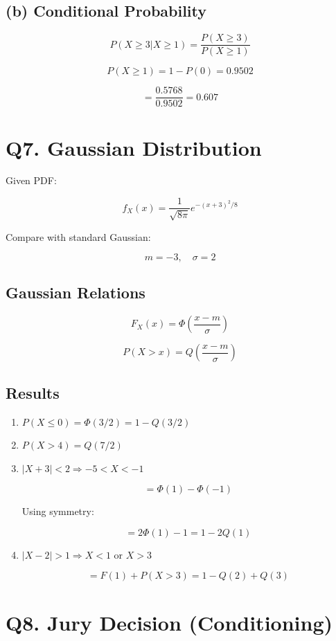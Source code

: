 \documentclass[12pt]{article}
\begin{document}
\subsection*{(b) Conditional Probability}

\[
P(X\ge3|X\ge1)=\frac{P(X\ge3)}{P(X\ge1)}
\]

\[
P(X\ge1)=1-P(0)=0.9502
\]

\[
= \frac{0.5768}{0.9502}=0.607
\]

\section*{Q7. Gaussian Distribution}

Given PDF:

\[
f_X(x)=\frac{1}{\sqrt{8\pi}} e^{-(x+3)^2/8}
\]

Compare with standard Gaussian:

\[
m=-3,\quad \sigma=2
\]

\subsection*{Gaussian Relations}

\[
F_X(x)=\Phi\left(\frac{x-m}{\sigma}\right)
\]

\[
P(X>x)=Q\left(\frac{x-m}{\sigma}\right)
\]

\subsection*{Results}

\begin{enumerate}
    \item $P(X\le0)=\Phi(3/2)=1-Q(3/2)$
    \item $P(X>4)=Q(7/2)$
    \item $|X+3|<2\Rightarrow -5<X<-1$
    
    \[
    = \Phi(1)-\Phi(-1)
    \]
    
    Using symmetry:
    
    \[
    =2\Phi(1)-1=1-2Q(1)
    \]
    
    \item $|X-2|>1\Rightarrow X<1 \text{ or } X>3$
    
    \[
    =F(1)+P(X>3)=1-Q(2)+Q(3)
    \]
\end{enumerate}

\section*{Q8. Jury Decision (Conditioning)}
\end{document}
